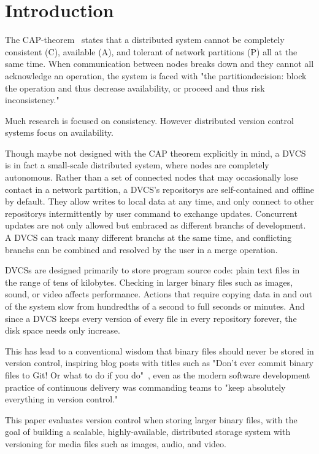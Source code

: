 \section{Introduction}

The \gls{CAP-theorem}~\cite{cap_origin} states that a distributed system cannot be completely consistent (C), available (A), and tolerant of network partitions (P) all at the same time.
When communication between nodes breaks down and they cannot all acknowledge an operation, the system is faced with "the \gls{partitiondecision}: block the operation and thus decrease availability, or proceed and thus risk inconsistency."~\cite{cap_years_later}

Much research is focused on consistency.
However distributed version control systems focus on availability.

Though maybe not designed with the CAP theorem explicitly in mind, a \gls{DVCS} is in fact a small-scale distributed system, where nodes are completely autonomous.
Rather than a set of connected nodes that may occasionally lose contact in a network partition, a \gls{DVCS}'s \glspl{repository} are self-contained and offline by default.
They allow writes to local data at any time, and only connect to other \glspl{repository} intermittently by user command to exchange updates.
Concurrent updates are not only allowed but embraced as different \glspl{branch} of development.
A \gls{DVCS} can track many different \glspl{branch} at the same time, and conflicting \glspl{branch} can be combined and resolved by the user in a \gls{merge} operation.

\Glspl{DVCS} are designed primarily to store program source code: plain text files in the range of tens of kilobytes.
Checking in larger binary files such as images, sound, or video affects performance.
Actions that require copying data in and out of the system slow from hundredths of a second to full seconds or minutes.
And since a \gls{DVCS} keeps every version of every file in every \gls{repository} forever, the disk space needs only increase.

This has lead to a conventional wisdom that binary files should never be stored in version control, inspiring blog posts with titles such as
"Don't ever commit binary files to Git! Or what to do if you do"~\cite{dont_ever_commit_binaries_to_version_control},
even as the modern software development practice of continuous delivery was commanding teams to "keep absolutely everything in version control."~\cite[p.33]{continuousdeliverybook}

This paper evaluates version control when storing larger binary files, with the goal of building a scalable, highly-available, distributed storage system with versioning for media files such as images, audio, and video.

